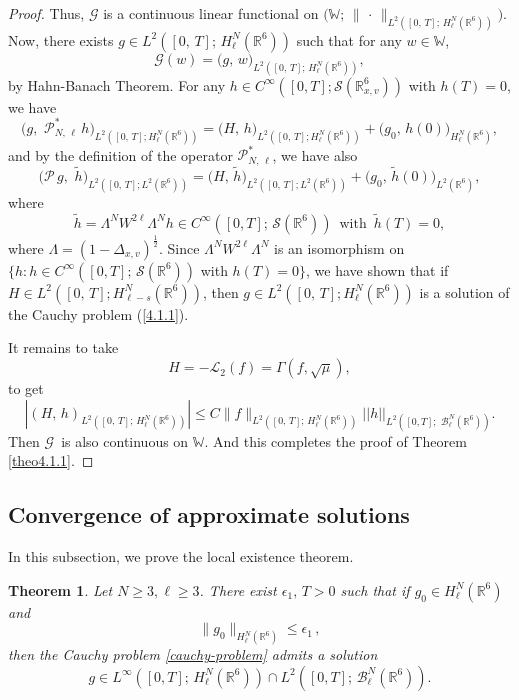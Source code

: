 \documentclass{amsart}[12pt, article]
\newtheorem{theo}{Theorem}[section]
\begin{document}
\begin{proof}
Thus,
${\mathcal G}$ is a continuous linear functional on $\Big({\mathbb
W};\,\|\,\cdot\,\|_{L^2 ([0,\,T];\, H^N_\ell({{{\mathbb R}}}^6))}\Big)$. Now, there
exists $g\in L^2 ([0,\,T];\, H^N_\ell({{{\mathbb R}}}^6))$ such that for any
$w\in{\mathbb W}$,
$$
{\mathcal G}(w)= \big(g,\,w\big)_{L^2 ([0,\,T];\, H^N_\ell({{{\mathbb R}}}^6))},
$$ by Hahn-Banach Theorem. For any $h\in C^\infty ([0,T]; {\mathcal S}
({{{\mathbb R}}}^6_{x,v}) )$ with $h(T) =0$, we have
$$
\Big(g,\,\, {\mathcal P}^*_{N,\,\ell} \, h\Big)_{L^2([0,\,T];
H^N_\ell({{{\mathbb R}}}^6))} = \big(H,\, h\big)_{L^2([0,\,T]; H^N_\ell({{{\mathbb R}}}^6))}
+ \big(g_0 ,\, h(0)\big)_{H^N_\ell({{{\mathbb R}}}^6)},
$$
and by the definition of the operator ${\mathcal P}^*_{N,\,\ell}$, we
have also
$$
\Big({\mathcal P}\,g,\,\, \tilde h\Big)_{L^2([0,\,T]; L^2({{{\mathbb R}}}^6))} =
\big(H,\, \tilde h\big)_{L^2([0,\,T]; L^2({{{\mathbb R}}}^6))} + \big(g_0 ,\,
\tilde h(0)\big)_{L^2({{{\mathbb R}}}^6)},
$$
where
$$
\tilde h  = \Lambda^N W^{2\ell} \Lambda^N h \in C^\infty ([0, T];\,
{\mathcal S}({{{\mathbb R}}}^6) )\,\,\, \mbox{with}\,\,\, \tilde h (T )=0,
$$
where $\Lambda=(1-\Delta_{x,v})^{\frac 12}$.
Since $\Lambda^N W^{2\ell} \Lambda^N $ is an isomorphism on
$\big\{h:h\in C^\infty ([0, T];\, {\mathcal S}({{{\mathbb R}}}^6) )$
with $ h (T )=0\big\}$, we have shown that if $H\in L^2
([0,\,T];\!\! H^N_{\ell-s}({{{\mathbb R}}}^6))$, then $g\in L^2 ([0,\,T];\!\!
H^N_\ell({{{\mathbb R}}}^6))$ is a solution of the Cauchy problem (\ref{4.1.1}).

It remains to take
$$
H=-{{\mathcal L}}_2(f)=\Gamma (f, \sqrt\mu),
$$
to get
$$
\left|(H,\,h)_{L^2 ([0,\,T];\, H^N_\ell({{{\mathbb R}}}^6))}\right|\leq C
 \|f\|_{L^2 ([0,\,T];\, H^N_{\ell}({{{\mathbb R}}}^6))}
|| h ||_{L^2([0, T];\,\,{{\mathcal B}}^N_\ell({{{\mathbb R}}}^6))}.
$$
Then ${\mathcal G}\,$ is also continuous on ${\mathbb W}$.
 And this completes the proof of Theorem \ref{theo4.1.1}.
\end{proof}

\subsection{Convergence of approximate solutions}\label{section4.2}
\setcounter{equation}{0} \smallbreak

In this subsection, we prove the local existence theorem.
\begin{theo}\label{theo4.2.1}
Let $N\geq 3, \ell\geq 3$. There exist $\epsilon_1,\, T>0$ such that if $g_0\in H^N_\ell({{{\mathbb R}}}^6)$ and
$$
\|g_0\|_{H^N_\ell({{{\mathbb R}}}^6)}\leq \epsilon_1\, ,
$$
then the Cauchy problem \eqref{cauchy-problem} admits a solution
$$
g \in L^\infty([0, T];\, H^N_\ell({{{\mathbb R}}}^6))\cap L^2([0, T];\,
{{\mathcal B}}^N_\ell({{{\mathbb R}}}^6)).
$$
\end{theo}
\end{document}
